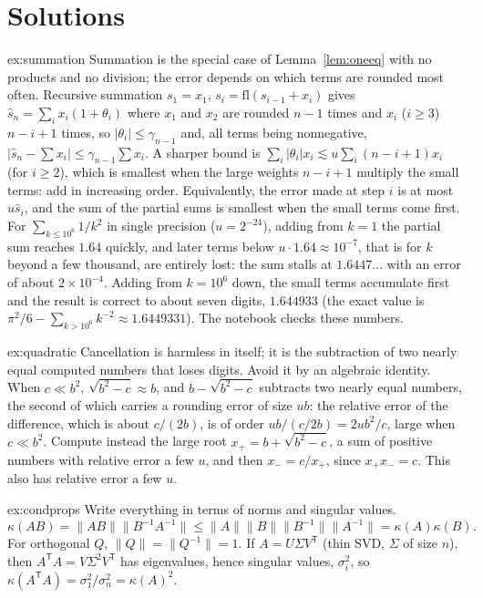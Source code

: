 \section{Solutions}

\begin{solution}{ex:summation}
\idea Summation is the special case of Lemma~\ref{lem:oneeq} with no products and no division; the error depends on which terms are rounded most often.
\writeup Recursive summation $s_1=x_1$, $s_i=\mathrm{fl}(s_{i-1}+x_i)$ gives $\hat s_n=\sum_ix_i(1+\theta_i)$ where $x_1$ and $x_2$ are rounded $n-1$ times and $x_i$
($i\ge3$) $n-i+1$ times, so $|\theta_i|\le\gamma_{n-1}$ and, all terms being nonnegative, $|\hat s_n-\sum x_i|\le\gamma_{n-1}\sum x_i$. A sharper bound is
$\sum_i|\theta_i|x_i\lesssim u\sum_i(n-i+1)x_i$ (for $i\ge2$), which is smallest when the large weights $n-i+1$ multiply the small terms: add in increasing
order. Equivalently, the error made at step $i$ is at most $u\hat s_i$, and the sum of the partial sums is smallest when the small terms come first. For
$\sum_{k\le10^6}1/k^2$ in single precision ($u=2^{-24}$), adding from $k=1$ the partial sum reaches $1.64$ quickly, and later terms below $u\cdot1.64\approx10^{-7}$,
that is for $k$ beyond a few thousand, are entirely lost: the sum stalls at $1.6447\dots$ with an error of about $2\times10^{-4}$. Adding from $k=10^6$ down, the
small terms accumulate first and the result is correct to about seven digits, $1.644933$ (the exact value is $\pi^2/6-\sum_{k>10^6}k^{-2}\approx1.6449331$).
The notebook checks these numbers.
\end{solution}

\begin{solution}{ex:quadratic}
\idea Cancellation is harmless in itself; it is the subtraction of two nearly equal computed numbers that loses digits. Avoid it by an algebraic identity.
\writeup When $c\ll b^2$, $\sqrt{b^2-c}\approx b$, and $b-\sqrt{b^2-c}$ subtracts two nearly equal numbers, the second of which carries a rounding error of size
$ub$: the relative error of the difference, which is about $c/(2b)$, is of order $ub/(c/2b)=2ub^2/c$, large when $c\ll b^2$. Compute instead the large root
$x_+=b+\sqrt{b^2-c}$, a sum of positive numbers with relative error a few $u$, and then $x_-=c/x_+$, since $x_+x_-=c$. This also has relative error a few $u$.
\end{solution}

\begin{solution}{ex:condprops}
\idea Write everything in terms of norms and singular values.
\writeup
\[
\kappa(AB)=\|AB\|\|B^{-1}A^{-1}\|\le\|A\|\|B\|\|B^{-1}\|\|A^{-1}\|=\kappa(A)\kappa(B).
\]
For orthogonal $Q$, $\|Q\|=\|Q^{-1}\|=1$. If $A=U\Sigma V^{\mathsf T}$
(thin SVD, $\Sigma$ of size $n$), then $A^{\mathsf T}A=V\Sigma^2V^{\mathsf T}$ has eigenvalues, hence singular values, $\sigma_i^2$, so
$\kappa(A^{\mathsf T}A)=\sigma_1^2/\sigma_n^2=\kappa(A)^2$.
\end{solution}

